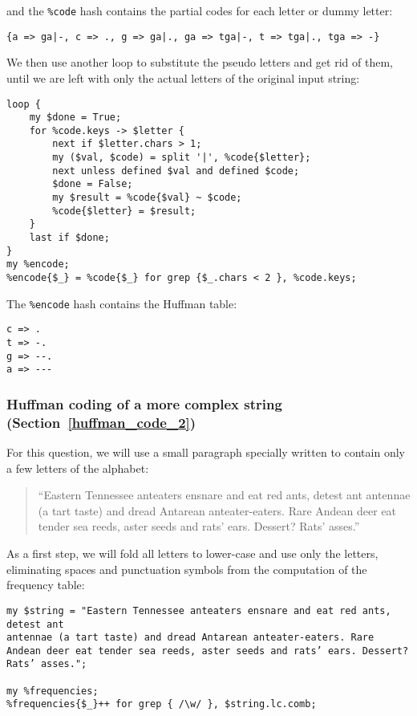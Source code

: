 and the \verb'%code' hash contains the partial codes for each 
letter or dummy letter:

\begin{verbatim}
{a => ga|-, c => ., g => ga|., ga => tga|-, t => tga|., tga => -}
\end{verbatim}

We then use another loop to substitute the pseudo letters and get 
rid of them, until we are left with only the actual letters of the 
original input string:

\begin{verbatim}
loop {   
    my $done = True;
    for %code.keys -> $letter {
        next if $letter.chars > 1;
        my ($val, $code) = split '|', %code{$letter};
        next unless defined $val and defined $code;
        $done = False;
        my $result = %code{$val} ~ $code;
        %code{$letter} = $result;
    }
    last if $done;
}
my %encode;
%encode{$_} = %code{$_} for grep {$_.chars < 2 }, %code.keys;
\end{verbatim}

The \verb'%encode' hash contains the Huffman table:

\begin{verbatim}
c => .
t => -.
g => --.
a => ---
\end{verbatim}

\subsubsection{Huffman coding of a more complex string (Section~\ref{huffman_code_2})}

For this question, we will use a small paragraph specially written 
to contain only a few letters of the alphabet:

\begin{quote}
``Eastern Tennessee anteaters ensnare and eat red ants, detest ant
antennae (a tart taste) and dread Antarean anteater-eaters. Rare
Andean deer eat tender sea reeds, aster seeds and rats’ ears. Dessert?
Rats’ asses.''
\end{quote}

As a first step, we will fold all letters to lower-case and use 
only the letters, eliminating spaces and punctuation symbols from 
the computation of the frequency table:

\begin{verbatim}
my $string = "Eastern Tennessee anteaters ensnare and eat red ants, detest ant
antennae (a tart taste) and dread Antarean anteater-eaters. Rare
Andean deer eat tender sea reeds, aster seeds and rats’ ears. Dessert?
Rats’ asses."; 

my %frequencies;
%frequencies{$_}++ for grep { /\w/ }, $string.lc.comb;
\end{verbatim}

